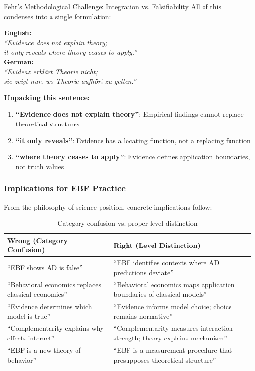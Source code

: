 \begin{chapter}{Fehr's Methodological Challenge: Integration vs. Falsifiability}
All of this condenses into a single formulation:

\begin{tcolorbox}[colback=red!5!white,colframe=red!75!black,title=\textbf{The Philosophy of Science Position}]
\begin{center}
\Large
\textbf{English:}\\[0.3em]
\textit{``Evidence does not explain theory;\\
it only reveals where theory ceases to apply.''}\\[1em]

\textbf{German:}\\[0.3em]
\textit{``Evidenz erklärt Theorie nicht;\\
sie zeigt nur, wo Theorie aufhört zu gelten.''}
\end{center}
\end{tcolorbox}

\textbf{Unpacking this sentence:}
\begin{enumerate}[noitemsep]
    \item \textbf{``Evidence does not explain theory''}: Empirical findings cannot replace theoretical structures
    \item \textbf{``it only reveals''}: Evidence has a locating function, not a replacing function
    \item \textbf{``where theory ceases to apply''}: Evidence defines application boundaries, not truth values
\end{enumerate}

\subsubsection{Implications for EBF Practice}

From the philosophy of science position, concrete implications follow:

\begin{table}[h!]
\centering
\begin{tabular}{p{}|p{}}
\toprule
\textbf{Wrong (Category Confusion)} & \textbf{Right (Level Distinction)} \\
\midrule
``EBF shows AD is false'' & ``EBF identifies contexts where AD predictions deviate'' \\
\midrule
``Behavioral economics replaces classical economics'' & ``Behavioral economics maps application boundaries of classical models'' \\
\midrule
``Evidence determines which model is true'' & ``Evidence informs model choice; choice remains normative'' \\
\midrule
``Complementarity explains why effects interact'' & ``Complementarity measures interaction strength; theory explains mechanism'' \\
\midrule
``EBF is a new theory of behavior'' & ``EBF is a measurement procedure that presupposes theoretical structure'' \\
\bottomrule
\end{tabular}
\caption{Category confusion vs. proper level distinction}
\end{table}


\end{chapter}
